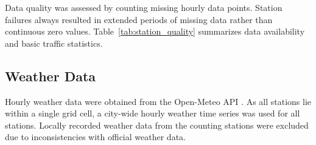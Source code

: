 \documentclass{article}
\begin{document}
Data quality was assessed by counting missing hourly data points. Station failures always resulted in extended periods of missing data rather than continuous zero values. Table~\ref{tab:station_quality} summarizes data availability and basic traffic statistics.

\begin{table}[t]
\centering
\caption{Data quality and traffic statistics for Heidelberg bicycle counting stations.}
\label{tab:station_quality}
\end{table}

\subsection{Weather Data}
Hourly weather data were obtained from the Open-Meteo API \cite{open_meteo_api}.
As all stations lie within a single grid cell, a city-wide hourly weather time series was used for all stations.
Locally recorded weather data from the counting stations were excluded due to inconsistencies with official weather data.
\end{document}
